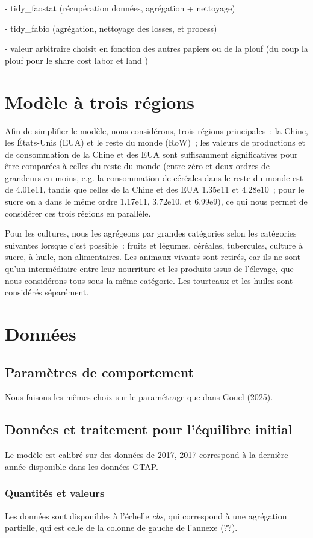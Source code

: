 - tidy\_faostat (récupération données, agrégation + nettoyage)

- tidy\_fabio (agrégation, nettoyage des losses, et process)

- valeur arbitraire choisit en fonction des autres papiers ou de la plouf (du coup la plouf pour le share cost labor et land )

\section{Modèle à trois régions}
Afin de simplifier le modèle, nous considérons, trois régions principales~: la Chine, les États-Unis (EUA) et le reste du monde (RoW)~; les valeurs de productions et de consommation de la Chine et des EUA sont suffisamment significatives pour être comparées à celles du reste du monde (entre zéro et deux ordres de grandeurs en moins, e.g. la consommation de céréales dans le reste du monde est de 4.01e11, tandis que celles de la Chine et des EUA 1.35e11 et 4.28e10~; pour le sucre on a dans le même ordre 1.17e11, 3.72e10, et 6.99e9), ce qui nous permet de considérer ces trois régions en parallèle.

Pour les cultures, nous les agrégeons par grandes catégories selon les catégories suivantes lorsque c’est possible~: fruits et légumes, céréales, tubercules, culture à sucre, à huile, non-alimentaires. Les animaux vivants sont retirés, car ils ne sont qu’un intermédiaire entre leur nourriture et les produits issus de l’élevage, que nous considérons tous sous la même catégorie. Les tourteaux et les huiles sont considérés séparément.


\section{Données}
\subsection{Paramètres de comportement}
Nous faisons les mêmes choix sur le paramétrage que dans Gouel (2025).

\subsection{Données et traitement pour l’équilibre initial}

Le modèle est calibré sur des données de 2017, 2017 correspond à la dernière année disponible dans les données GTAP.


\subsubsection{Quantités et valeurs}
Les données sont disponibles à l'échelle \textit{cbs}, qui correspond à une agrégation partielle, qui est celle de la colonne de gauche de l'annexe (??).


